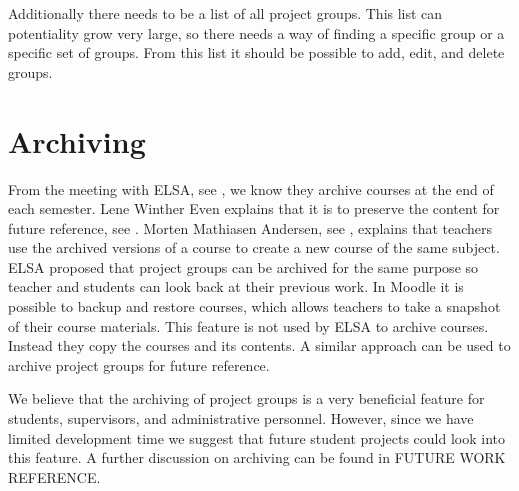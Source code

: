 Additionally there needs to be a list of all project groups.
This list can potentiality grow very large, so there needs a way of finding a specific group or a specific set of groups. 
From this list it should be possible to add, edit, and delete groups. 



\section{Archiving}
\label{sub:analysarchiving}
From the meeting with ELSA, see , we know they archive courses at the end of each semester. 
Lene Winther Even explains that it is to preserve the content for future reference, see . 
Morten Mathiasen Andersen, see , explains that teachers use the archived versions of a course to create a new course of the same subject. 
ELSA proposed that project groups can be archived for the same purpose so teacher and students can look back at their previous work.
In Moodle it is possible to backup and restore courses, which allows teachers to take a snapshot of their course materials. 
This feature is not used by ELSA to archive courses.
Instead they copy the courses and its contents.
A similar approach can be used to archive project groups for future reference. 

We believe that the archiving of project groups is a very beneficial feature for students, supervisors, and administrative personnel.
However, since we have limited development time we suggest that future student projects could look into this feature.
A further discussion on archiving can be found in FUTURE WORK REFERENCE. 

